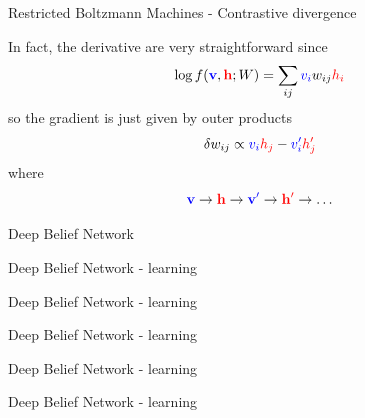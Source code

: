 \documentclass{beamer}
\newcommand{\vi}{\color{blue}v_i\color{black}}
\newcommand{\hj}{\color{red}h_j\color{black}}
\newcommand{\hi}{\color{red}h_i\color{black}}
\newcommand{\vbf}{\color{blue}\mathbf{v}\color{black}}
\newcommand{\hbf}{\color{red}\mathbf{h}\color{black}}
\newcommand{\cor}{\color{reddish}{}}
\newcommand{\cob}{\color{black}{}}
\begin{document}
\begin{frame}{Restricted Boltzmann Machines - Contrastive divergence}

  \cor{} In fact, the derivative are very straightforward since\cob{}
  $$
  \log{f(\vbf,\hbf;W)}={\sum_{ij}\vi w_{ij} \hi}
  $$
  \cor{} so the gradient is just given by outer products\cob{}
  $$
  \delta w_{ij}\propto \vi \hj-\color{blue}v_i'\color{red}h_j'\color{black}
  $$
  \cor{}where\cob{}
  $$
  \color{blue}\mathbf{v}\color{black}\rightarrow\color{red}\mathbf{h}\color{black}\rightarrow
  \color{blue}\mathbf{v}'\color{black}\rightarrow\color{red}\mathbf{h}'\color{black}\rightarrow
  \ldots
  $$
\end{frame}
  
\begin{frame}{Deep Belief Network}
\def\layersep{2.5cm}
  \begin{center}
    
  \end{center}
\end{frame}

\begin{frame}{Deep Belief Network - learning}
\def\layersep{2.5cm}
  \begin{center}
    
  \end{center}
\end{frame}

\begin{frame}{Deep Belief Network - learning}
\def\layersep{2.5cm}
  \begin{center}
    
  \end{center}
\end{frame}


\begin{frame}{Deep Belief Network - learning}
\def\layersep{2.5cm}
  \begin{center}
    
  \end{center}
\end{frame}


\begin{frame}{Deep Belief Network - learning}
\def\layersep{2.5cm}
  \begin{center}
    
  \end{center}
\end{frame}


\begin{frame}{Deep Belief Network - learning}
\def\layersep{2.5cm}
  \begin{center}
    
  \end{center}
\end{frame}
\end{document}

